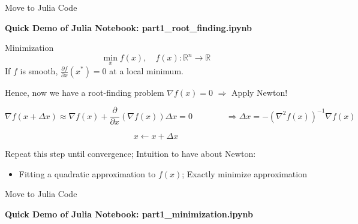 \begin{frame}{Move to Julia Code}
\begin{center}
    \textbf{Quick Demo of Julia Notebook: part1\_root\_finding.ipynb}
\end{center}
\end{frame}


\begin{frame}{Minimization}
$$
\min_x f(x), \quad f(x): \mathbb{R}^n \to \mathbb{R}
$$
If $f$ is smooth, $\frac{\partial f}{\partial x}(x^*) = 0$ at a local minimum. 

Hence, now we have a root-finding problem $\nabla f(x) = 0$ $\Rightarrow$ Apply Newton!

$$
\nabla f(x+\Delta x) \approx \nabla f(x) + \frac{\partial}{\partial x}(\nabla f(x))\Delta x = 0
\quad \quad \quad \quad 
\Rightarrow \Delta x = -(\nabla^2 f(x))^{-1}\nabla f(x)
$$

$$
x \leftarrow x + \Delta x
$$

Repeat this step until convergence; Intuition to have about Newton:
\begin{itemize}
    \item Fitting a quadratic approximation to $f(x)$; Exactly minimize approximation
\end{itemize} 
    
\end{frame}


\begin{frame}{Move to Julia Code}
\begin{center}
    \textbf{Quick Demo of Julia Notebook: part1\_minimization.ipynb}
\end{center}
\end{frame}



